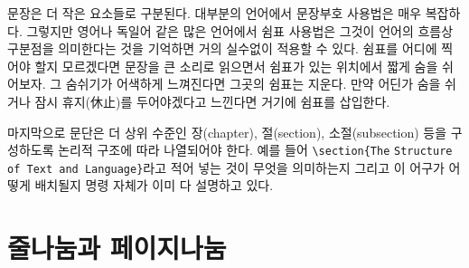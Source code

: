 문장은 더 작은 요소들로 구분된다. 대부분의 언어에서 문장부호 사용법은 매우 복잡하다. 
그렇지만 영어나 독일어 같은 많은 언어에서 쉼표 사용법은 그것이 언어의 흐름상 구분점을 의미한다는 것을
기억하면 거의 실수없이 적용할 수 있다.
쉼표를 어디에 찍어야 할지 모르겠다면 문장을 큰 소리로 읽으면서 쉼표가 있는 위치에서 짧게 숨을 쉬어보자.
그 숨쉬기가 어색하게 느껴진다면 그곳의 쉼표는 지운다. 만약 어딘가 숨을 쉬거나 잠시 휴지(休止)를 두어야겠다고
느낀다면 거기에 쉼표를 삽입한다.

마지막으로 문단은 더 상위 수준인 장(chapter), 절(section), 소절(subsection) 등을 구성하도록 논리적 구조에 따라 나열되어야 한다.
예를 들어 \verb|\section{The| \texttt{Structure of Text and Language}\verb|}|라고 적어 넣는 것이 무엇을 의미하는지 그리고 이 어구가 어떻게 배치될지 명령 자체가 이미 다 설명하고 있다.

\section{줄나눔과 페이지나눔}


